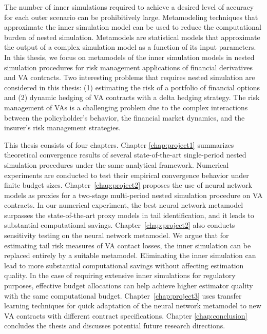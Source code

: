 The number of inner simulations required to achieve a desired level of accuracy for each outer scenario can be prohibitively large.
Metamodeling techniques that approximate the inner simulation model can be used to reduce the computational burden of nested simulation.
Metamodels are statistical models that approximate the output of a complex simulation model as a function of its input parameters.
In this thesis, we focus on metamodels of the inner simulation models in nested simulation procedures for risk management applications of financial derivatives and VA contracts.
Two interesting problems that requires nested simulation are considered in this thesis: (1) estimating the risk of a portfolio of financial options and (2) dynamic hedging of VA contracts with a delta hedging strategy.
The risk management of VAs is a challenging problem due to the complex interactions between the policyholder's behavior, the financial market dynamics, and the insurer's risk management strategies.

This thesis consists of four chapters. Chapter \ref{chap:project1} summarizes theoretical convergence results of several state-of-the-art single-period nested simulation procedures under the same analytical framework. Numerical experiments are conducted to test their empirical convergence behavior under finite budget sizes.
Chapter~\ref{chap:project2} proposes the use of neural network models as proxies for a two-stage multi-period nested simulation procedure on VA contracts. 
In our numerical experiment, the best neural network metamodel surpasses the state-of-the-art proxy models in tail identification, and it leads to substantial computational savings. 
Chapter~\ref{chap:project2} also conducts sensitivity testing on the neural network metamodel. We argue that for estimating tail risk measures of VA contact losses, the inner simulation can be replaced entirely by a suitable metamodel. 
Eliminating the inner simulation can lead to more substantial computational savings without affecting estimation quality. 
In the case of requiring extensive inner simulations for regulatory purposes, effective budget allocations can help achieve higher estimator quality with the same computational budget.
Chapter~\ref{chap:project3} uses transfer learning techniques for quick adaptation of the neural network metamodel to new VA contracts with different contract specifications.
Chapter \ref{chap:conclusion} concludes the thesis and discusses potential future research directions.

